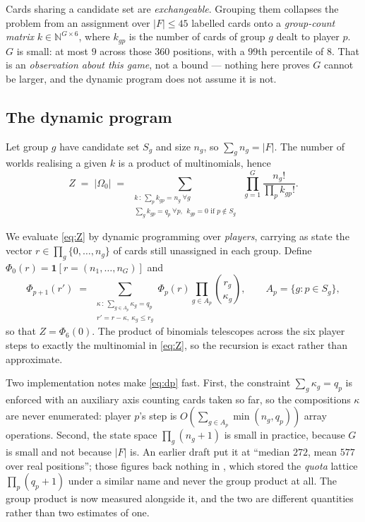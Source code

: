 \documentclass[11pt,letterpaper]{article}
\newcommand{\ind}[1]{\ensuremath{\mathbf{1}\!\left[#1\right]}}
\begin{document}
Cards sharing a candidate set are \emph{exchangeable}. Grouping them collapses
the problem from an assignment over $|F| \le 45$ labelled cards onto a
\emph{group-count matrix} $k \in \mathbb{N}^{G\times 6}$, where $k_{gp}$ is the
number of cards of group $g$ dealt to player $p$. $G$ is small: at most $9$
across those $360$ positions, with a $99$th percentile of $8$. That is an
\emph{observation about this game}, not a bound --- nothing here proves $G$
cannot be larger, and the dynamic program does not assume it is not.

\subsection{The dynamic program}

Let group $g$ have candidate set $S_g$ and size $n_g$, so $\sum_g n_g = |F|$.
The number of worlds realising a given $k$ is a product of multinomials, hence
\begin{equation}
Z \;=\; |\Omega_0| \;=\;
\sum_{\substack{k \,:\, \sum_p k_{gp} = n_g \ \forall g \\
\sum_g k_{gp} = q_p \ \forall p, \ \ k_{gp}=0 \text{ if } p \notin S_g}}
\;\prod_{g=1}^{G} \frac{n_g!}{\prod_p k_{gp}!}.
\label{eq:Z}
\end{equation}

We evaluate \eqref{eq:Z} by dynamic programming over \emph{players}, carrying
as state the vector $r \in \prod_g \{0,\dots,n_g\}$ of cards still unassigned
in each group. Define $\Phi_0(r) = \ind{r = (n_1,\dots,n_G)}$ and
\begin{equation}
\Phi_{p+1}(r') \;=\;
\sum_{\substack{\kappa \,:\, \sum_{g \in A_p}\kappa_g = q_p\\ r' = r - \kappa,\ \kappa_g \le r_g}}
\Phi_p(r) \prod_{g \in A_p} \binom{r_g}{\kappa_g},
\qquad A_p = \{g : p \in S_g\},
\label{eq:dp}
\end{equation}
so that $Z = \Phi_6(0)$. The product of binomials telescopes across the six
player steps to exactly the multinomial in \eqref{eq:Z}, so the recursion is
exact rather than approximate.

Two implementation notes make \eqref{eq:dp} fast. First, the constraint
$\sum_g \kappa_g = q_p$ is enforced with an auxiliary axis counting cards taken
so far, so the compositions $\kappa$ are never enumerated: player $p$'s step is
$O(\sum_{g \in A_p} \min(n_g,q_p))$ array operations. Second, the state space
$\prod_g (n_g+1)$ is small in practice, because $G$ is small and not because
$|F|$ is. An earlier draft put it at ``median $272$, mean $577$ over real
positions''; those figures back nothing in
, which stored the \emph{quota}
lattice $\prod_p (q_p+1)$ under a similar name and never the group product at
all. The group product is now measured alongside it, and the two are different
quantities rather than two estimates of one.
\end{document}
